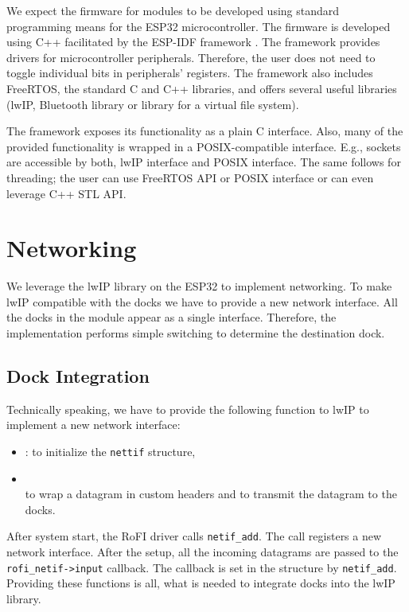 We expect the firmware for modules to be developed using standard programming
means for the ESP32 microcontroller. The firmware is developed using C++
facilitated by the ESP-IDF framework \cite{noauthor_esp-idf_nodate}. The
framework provides drivers for microcontroller peripherals. Therefore, the user
does not need to toggle individual bits in peripherals' registers. The framework
also includes FreeRTOS, the standard C and C++ libraries, and offers several
useful libraries (lwIP, Bluetooth library or library for a virtual file
system).

The framework exposes its functionality as a plain C interface. Also, many of
the provided functionality is wrapped in a POSIX-compatible interface. E.g.,
sockets are accessible by both, lwIP interface and POSIX interface. The same
follows for threading; the user can use FreeRTOS API or POSIX interface or can
even leverage C++ STL API.

\section{Networking} \label{sec:networking}

We leverage the lwIP library on the ESP32 to implement networking. To make lwIP
compatible with the docks we have to provide a new network interface.
All the docks in the module appear as a single interface. Therefore, the
implementation performs simple switching to determine the destination dock.

\subsection{Dock Integration}

Technically speaking, we have to provide the following function to lwIP to
implement a new network interface:
\begingroup
\setlength{\rightskip}{0pt plus 1 fil}
\begin{itemize}
    \item {}:
    to initialize the \texttt{nettif} structure,
    \item {} \\ 
    to wrap a datagram in custom headers and to transmit the datagram to the
    docks.
\end{itemize}
\endgroup
After system start, the RoFI driver calls \texttt{netif\_add}. The call
registers a new network interface. After the setup, all the incoming datagrams
are passed to the \texttt{rofi\_netif->input} callback. The callback is set in
the structure by \texttt{netif\_add}. Providing these functions is all, what is
needed to integrate docks into the lwIP library.

